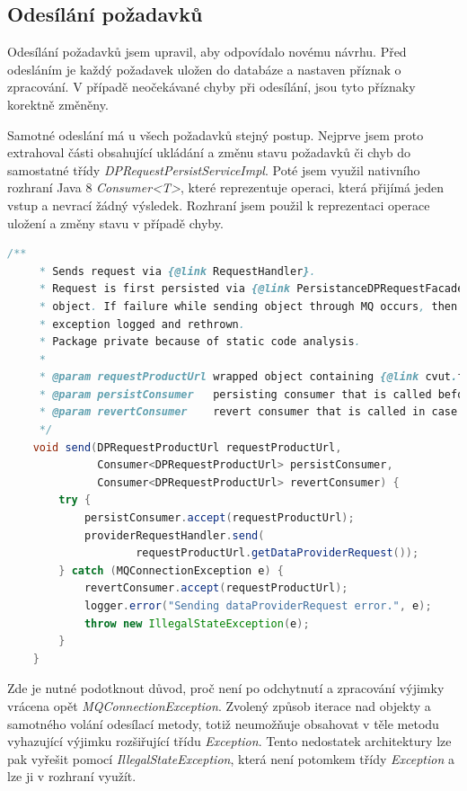 \documentclass[thesis=B,czech]{FITthesis}[2012/06/26]
\begin{document}
\subsection{Odesílání požadavků}
Odesílání požadavků jsem upravil, aby odpovídalo novému návrhu. Před odesláním je každý požadavek uložen do databáze a nastaven
příznak o zpracování. V případě neočekávané chyby při odesílání, jsou tyto příznaky korektně změněny.
\par
Samotné odeslání má u všech požadavků stejný postup. Nejprve jsem proto extrahoval části obsahující ukládání a změnu stavu požadavků či chyb do samostatné třídy
\textit{DPRequestPersistServiceImpl}. Poté jsem využil nativního rozhraní Java 8 \textit{Consumer<T>}, které reprezentuje
operaci, která přijímá jeden vstup a nevrací žádný výsledek. Rozhraní jsem použil k reprezentaci operace uložení a
změny stavu v případě chyby.
\par
\begin{lstlisting}[language=Java, caption={Společná metoda zajišťující odeslání DataProvider požadavků}]
    /**
     * Sends request via {@link RequestHandler}.
     * Request is first persisted via {@link PersistanceDPRequestFacade} and it's id is set to the request in wrapper
     * object. If failure while sending object through MQ occurs, then {@link Consumer} failureHandler is called,
     * exception logged and rethrown.
     * Package private because of static code analysis.
     *
     * @param requestProductUrl wrapped object containing {@link cvut.fit.persistence.entity.ProductUrl}, {@link DataProviderRequest}
     * @param persistConsumer   persisting consumer that is called before sending
     * @param revertConsumer    revert consumer that is called in case of sending failure
     */
    void send(DPRequestProductUrl requestProductUrl,
              Consumer<DPRequestProductUrl> persistConsumer,
              Consumer<DPRequestProductUrl> revertConsumer) {
        try {
            persistConsumer.accept(requestProductUrl);
            providerRequestHandler.send(
                    requestProductUrl.getDataProviderRequest());
        } catch (MQConnectionException e) {
            revertConsumer.accept(requestProductUrl);
            logger.error("Sending dataProviderRequest error.", e);
            throw new IllegalStateException(e);
        }
    }
\end{lstlisting}

Zde je nutné podotknout důvod, proč není po odchytnutí a zpracování výjimky vrácena opět \textit{MQConnectionException}. 
Zvolený způsob iterace nad objekty a samotného volání odesílací metody, totiž neumožňuje obsahovat v těle metodu
vyhazující výjimku rozšiřující třídu \textit{Exception}.
Tento nedostatek architektury lze pak vyřešit pomocí \textit{IllegalStateException}, která není potomkem třídy \textit{Exception} a lze ji
v rozhraní využít.
\par
\end{document}
